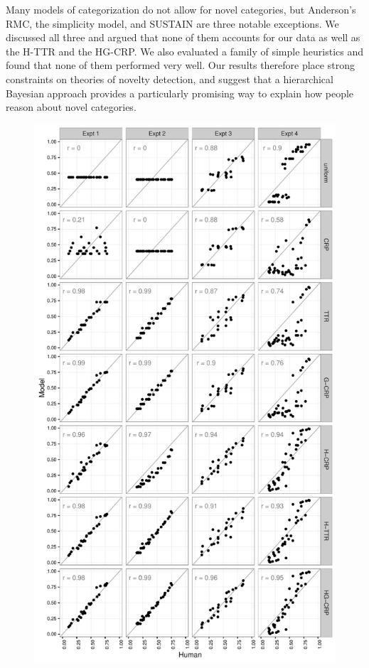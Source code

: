 \documentclass[doc]{apa6}
\begin{document}
Many models of categorization do not allow for novel categories, but Anderson's RMC, the simplicity model, and SUSTAIN are three notable exceptions. We discussed all three and argued that none of them accounts for our data as well as the H-TTR and the HG-CRP. We also evaluated a family of simple heuristics and found that none of them performed very well. Our results therefore place strong constraints on theories of novelty detection, and suggest that a hierarchical Bayesian approach provides a particularly promising way to explain how people reason about novel categories.


\begin{figure}[p]
\begin{center}
\includegraphics[scale=.55]{allexpts.pdf}

\end{center}
\end{figure}
\end{document}
